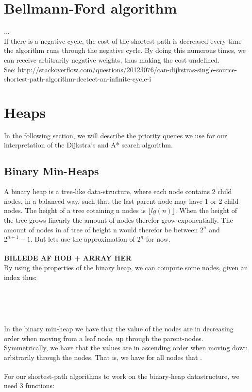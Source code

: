 \documentclass[11pt]{article}
\begin{document}
\section{Bellmann-Ford algorithm}
...\\
If there is a negative cycle, the cost of the shortest path is decreased every time the algorithm runs through the negative cycle. By doing this numerous times, we can receive arbitrarily negative weights, thus making the cost undefined.\\

See: http://stackoverflow.com/questions/20123076/can-dijkstras-single-source-shortest-path-algorithm-dectect-an-infinite-cycle-i\\


\section{Heaps}
In the following section, we will describe the priority queues we use for our interpretation of the Dijkstra's  and A* search algorithm.\\
\subsection{Binary Min-Heaps}
A binary heap is a tree-like data-structure, where each node contains 2 child nodes, in a balanced way, such that the last parent node may have 1 or 2 child nodes. The height of a tree cotaining n nodes is $\lfloor lg(n) \rfloor$. When the height of the tree grows linearly the amount of nodes therefor grow exponentially. The amount of nodes in af tree of height n would therefor be between $2^n$ and $2^{n+1}-1$. But lets use the approximation of $2^n$ for now.\\\\
\textbf{BILLEDE AF HOB + ARRAY HER}\\
By using the properties of the binary heap, we can compute some nodes, given an index thus:\\
\begin{center}
\\
\\
\\
\end{center}
In the binary min-heap we have that the value of the nodes are in decreasing order when moving from a leaf node, up through the parent-nodes. Symmetrically, we have that the values are in ascending order when moving down arbitrarily through the nodes. That is, we have for all nodes that .\\\\
For our shortest-path algorithms to work on the binary-heap datastructure, we need 3 functions:
\end{document}
